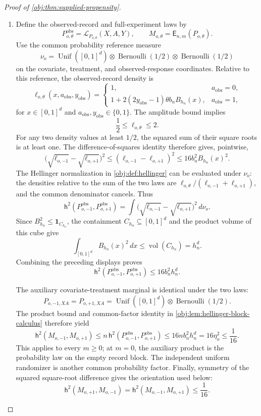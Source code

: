 \begin{proof}[Proof of \cref{obj:thm:supplied-propensity}]
\begin{enumerate}
\item Define the observed-record and full-experiment laws by
\[
P_{o,\theta}^{\mathrm{obs}}
=\mathcal L_{P_{o,\theta}}(X,A,Y),
\qquad
M_{o,\theta}=\mathsf E_{n,m}(P_{o,\theta}).
\]
Use the common probability reference measure
\[
\nu_o
=
\operatorname{Unif}([0,1]^d)
\otimes\operatorname{Bernoulli}(1/2)
\otimes\operatorname{Bernoulli}(1/2)
\]
on the covariate, treatment, and observed-response coordinates. Relative to this reference, the observed-record density is
\[
\ell_{o,\theta}(x,a_{\mathrm{obs}},y_{\mathrm{obs}})
=
\begin{cases}
1,&a_{\mathrm{obs}}=0,\\
1+2(2y_{\mathrm{obs}}-1)\theta b_nB_{h_n}(x),
&a_{\mathrm{obs}}=1,
\end{cases}
\]
for \(x\in[0,1]^d\) and \(a_{\mathrm{obs}},y_{\mathrm{obs}}\in\{0,1\}\). The amplitude bound implies
\[
\frac12\le\ell_{o,\theta}\le2.
\]
For any two density values at least \(1/2\), the squared sum of their square roots is at least one. The difference-of-squares identity therefore gives, pointwise,
\[
\bigl(\sqrt{\ell_{o,-1}}-\sqrt{\ell_{o,+1}}\bigr)^2
\le
(\ell_{o,-1}-\ell_{o,+1})^2
\le16b_n^2B_{h_n}(x)^2.
\]
The Hellinger normalization in \cref{obj:def:hellinger} can be evaluated under \(\nu_o\): the densities relative to the sum of the two laws are
\(\ell_{o,\theta}/(\ell_{o,-1}+\ell_{o,+1})\), and the common denominator cancels. Thus
\[
\mathsf h^2(P_{o,-1}^{\mathrm{obs}},P_{o,+1}^{\mathrm{obs}})
=
\int
\bigl(\sqrt{\ell_{o,-1}}-\sqrt{\ell_{o,+1}}\bigr)^2\,d\nu_o.
\]
Since \(B_{h_n}^2\le\mathbf1_{C_{h_n}}\), the containment
\(C_{h_n}\subseteq[0,1]^d\) and the product volume of this cube give
\[
\int_{[0,1]^d}B_{h_n}(x)^2\,dx
\le\operatorname{vol}(C_{h_n})
=h_n^d.
\]
Combining the preceding displays proves
\[
\mathsf h^2(P_{o,-1}^{\mathrm{obs}},P_{o,+1}^{\mathrm{obs}})
\le16b_n^2h_n^d.
\]

The auxiliary covariate-treatment marginal is identical under the two laws:
\[
P_{o,-1,XA}=P_{o,+1,XA}
=
\operatorname{Unif}([0,1]^d)\otimes\operatorname{Bernoulli}(1/2).
\]
The product bound and common-factor identity in
\cref{obj:lem:hellinger-block-calculus} therefore yield
\[
\mathsf h^2(M_{o,-1},M_{o,+1})
\le
n\,\mathsf h^2(P_{o,-1}^{\mathrm{obs}},P_{o,+1}^{\mathrm{obs}})
\le16n b_n^2h_n^d
=16\eta_o^2
\le\frac1{16}.
\]
This applies to every \(m\ge0\); at \(m=0\), the auxiliary product is the probability law on the empty record block. The independent uniform randomizer is another common probability factor. Finally, symmetry of the squared square-root difference gives the orientation used below:
\[
\mathsf h^2(M_{o,+1},M_{o,-1})
=
\mathsf h^2(M_{o,-1},M_{o,+1})
\le\frac1{16}.
\]


\end{enumerate}
\end{proof}
